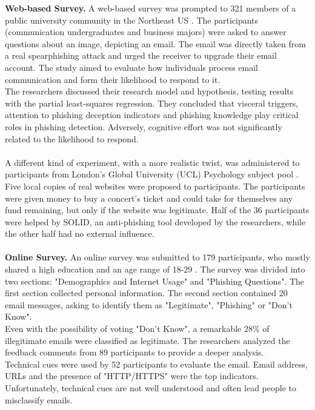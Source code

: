 \documentclass[a4paper]{article}
\begin{document}
\noindent
\textbf{Web-based Survey.} A web-based survey was prompted to 321 members of a public university community in the Northeast US \cite{lit-casestudy-investigation-spearphish}. The participants (communication undergraduates and business majors) were asked to answer questions about an image, depicting an email. The email was directly taken from a real spearphishing attack and urged the receiver to upgrade their email account. The study aimed to evaluate how individuals process email communication and form their likelihood to respond to it.
\\
The researchers discussed their research model and hypothesis, testing results with the partial least-squares regression. They concluded that visceral triggers, attention to phishing deception indicators and phishing knowledge play critical roles in phishing detection. Adversely, cognitive effort was not significantly related to the likelihood to respond.
\\ \\
A different kind of experiment, with a more realistic twist, was administered to participants from London's Global University (UCL) Psychology subject pool \cite{lit-casestudy-ticket-solid}. Five local copies of real websites were proposed to participants. The participants were given money to buy a concert's ticket and could take for themselves any fund remaining, but only if the website was legitimate. Half of the 36 participants were helped by SOLID, an anti-phishing tool developed by the researchers, while the other half had no external influence.
\\ \\
\textbf{Online Survey.} An online survey was submitted to 179 participants, who mostly shared a high education and an age range of 18-29 \cite{lit-casestudy-assessing-soceng}. The survey was divided into two sections: "Demographics and Internet Usage" and "Phishing Questions". The first section collected personal information. The second section contained 20 email messages, asking to identify them as "Legitimate", "Phishing" or "Don't Know". 
\\
Even with the possibility of voting "Don't Know", a remarkable 28\% of illegitimate emails were classified as legitimate. The researchers analyzed the feedback comments from 89 participants to provide a deeper analysis. 
\\
Technical cues were used by 52 participants to evaluate the email. Email address, URLs and the presence of "HTTP/HTTPS" were the top indicators. Unfortunately, technical cues are not well understood and often lead people to misclassify emails.
\end{document}
